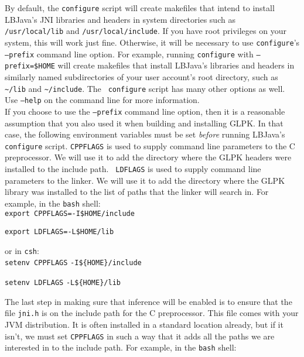 By default, the {\tt configure} script will create makefiles that intend to
install LBJava's JNI libraries and headers in system directories such as {\tt
/usr/local/lib} and {\tt /usr/local/include}.  If you have root privileges on
your system, this will work just fine.  Otherwise, it will be necessary to use
{\tt configure}'s {\tt --prefix} command line option.  For example, running
{\tt configure} with {\tt --prefix=\$HOME} will create makefiles that install
LBJava's libraries and headers in similarly named subdirectories of your user
account's root directory, such as \verb|~/lib| and \verb|~/include|.  The {\tt
configure} script has many other options as well.  Use {\tt --help} on the
command line for more information. \\

If you choose to use the {\tt --prefix} command line option, then it is a
reasonable assumption that you also used it when building and installing GLPK.
In that case, the following environment variables must be set \emph{before}
running LBJava's {\tt configure} script.  {\tt CPPFLAGS} is used to supply
command line parameters to the C preprocessor.  We will use it to add the
directory where the GLPK headers were installed to the include path.  {\tt
LDFLAGS} is used to supply command line parameters to the linker.  We will use
it to add the directory where the GLPK library was installed to the list of
paths that the linker will search in.  For example, in the {\tt bash} shell:
\\

\vspace{-.25cm}
{\tt export CPPFLAGS=-I\$HOME/include}

{\tt export LDFLAGS=-L\$HOME/lib} \\
\vspace{-.25cm}

\noindent
or in {\tt csh}: \\

\vspace{-.25cm}
{\tt setenv CPPFLAGS} \verb|-I${HOME}/include|

{\tt setenv LDFLAGS} \verb|-L${HOME}/lib| \\
\vspace{-.25cm}

The last step in making sure that inference will be enabled is to ensure that
the file {\tt jni.h} is on the include path for the C preprocessor.  This file
comes with your JVM distribution.  It is often installed in a standard
location already, but if it isn't, we must set {\tt CPPFLAGS} in such a way
that it adds all the paths we are interested in to the include path.  For
example, in the {\tt bash} shell: \\

